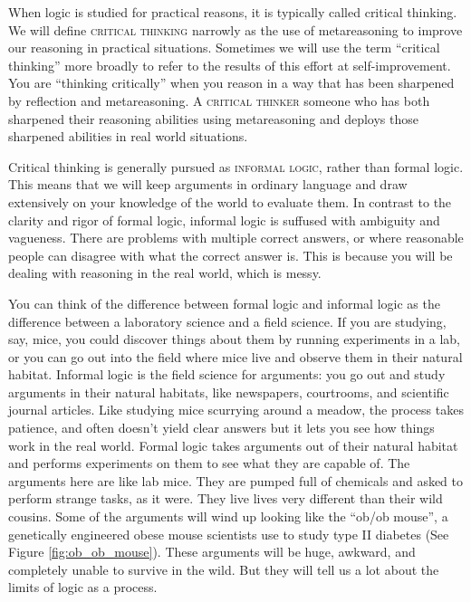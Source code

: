 When logic is studied for practical reasons, it is typically called critical thinking. We will define \textsc{\gls{critical thinking}}\label{def:Critical_Thinking}  narrowly as the use of metareasoning to improve our reasoning in practical situations.  Sometimes we will use the term ``critical thinking'' more broadly to refer to the results of this effort at self-improvement.  You are ``thinking critically'' when you reason in a way that has been sharpened by reflection and metareasoning. A \textsc{\gls{critical thinker}}\label{def:critical_thinker} someone who has both sharpened their reasoning abilities using metareasoning and deploys those sharpened abilities in real world situations.

Critical thinking is generally pursued as \textsc{\gls{informal logic}}, rather than formal logic. This means that we will keep arguments in ordinary language and draw extensively on your knowledge of the world to evaluate them. In contrast to the clarity and rigor of formal logic, informal logic is suffused with ambiguity and vagueness. There are problems  with multiple correct answers, or where reasonable people can disagree with what the correct answer is. This is because you will be dealing with reasoning in the real world, which is messy.

You can think of the difference between formal logic and informal logic as the difference between a laboratory science and a field science. \label{lab_vs._field_science} If you are studying, say, mice, you could discover things about them by running experiments in a lab, or you can go out into the field where mice live and observe them in their natural habitat.  Informal logic is the field science for arguments: you go out and study arguments in their natural habitats, like newspapers, courtrooms, and scientific journal articles. Like studying mice scurrying around a meadow, the process takes patience, and often doesn't yield clear answers but it lets you see how things work in the real world. Formal logic takes arguments out of their natural habitat and performs experiments on them to see what they are capable of. The arguments here are like lab mice. They are pumped full of chemicals and asked to perform strange tasks, as it were. They live lives very different than their wild cousins. Some of the arguments will wind up looking like the ``ob/ob mouse'', a genetically engineered obese mouse scientists use to study type II diabetes (See Figure \ref{fig:ob_ob_mouse}). These arguments will be huge, awkward, and completely unable to survive in the wild. But they will tell us a lot about the limits of logic as a process.

